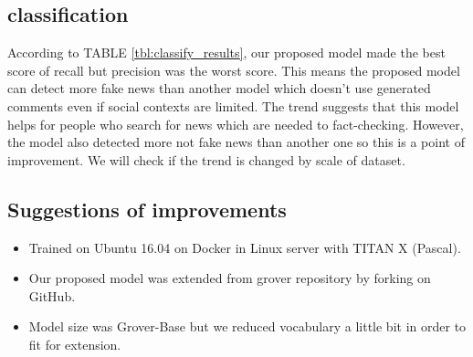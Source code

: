 \documentclass[conference]{IEEEtran}
\begin{document}
\subsection{classification}
According to TABLE \ref{tbl:classify_results}, our proposed model made the best score of recall but precision was the worst score.
This means the proposed model can detect more fake news than another model which doesn't use generated comments even if social contexts are limited. 
The trend suggests that this model helps for people who search for news which are needed to fact-checking. 
However, the model also detected more not fake news than another one so this is a point of improvement.
We will check if the trend is changed by scale of dataset.
\subsection{Suggestions of improvements}
\label{app:settings}
\begin{itemize}[]
    \item Trained on Ubuntu 16.04 on Docker in Linux server with TITAN X (Pascal).
    \item Our proposed model was extended from grover repository by forking on GitHub.
    \item Model size was Grover-Base but we reduced vocabulary a little bit in order to fit for extension.
\end{itemize}


\end{document}

